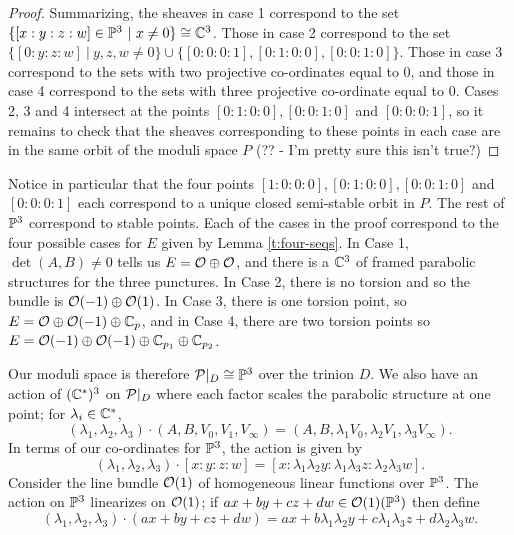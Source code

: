 \begin{proof}
		Summarizing, the sheaves in case 1 correspond to the set $\{[x:y:z:w]\in \mathbb{P}^3~|~ x\neq 0\} \cong \mathbb{C}^3$. Those in case 2 correspond to the set $\{[0:y:z:w]~|~ y,z,w\neq 0\}\cup \{[0:0:0:1],[0:1:0:0],[0:0:1:0]\}$. Those in case 3 correspond to the sets with two projective co-ordinates equal to 0, and those in case 4 correspond to the sets with three projective co-ordinate equal to 0. Cases 2, 3 and 4 intersect at the points $[0:1:0:0], [0:0:1:0]$ and $[0:0:0:1]$, so it remains to check that the sheaves corresponding to these points in each case are in the same orbit of the moduli space $P$ (?? - I'm pretty sure this isn't true?)
		
	\end{proof}
	Notice in particular that the four points $[1:0:0:0], [0:1:0:0], [0:0:1:0]$ and $[0:0:0:1]$ each correspond to a unique closed semi-stable orbit in $P$. The rest of $\mathbb{P}^3$ correspond to stable points. Each of the cases in the proof correspond to the four possible cases for $E$ given by Lemma \ref{t:four-seqs}. In Case 1, $\det(A,B)\neq 0$ tells us $E = \mathcal{O}\oplus \mathcal{O}$, and there is a $\mathbb{C}^3$ of framed parabolic structures for the three punctures. In Case 2, there is no torsion and so the bundle is $\mathcal{O}(-1)\oplus \mathcal{O}(1)$. In Case 3, there is one torsion point, so $E = \mathcal{O}\oplus \mathcal{O}(-1)\oplus \mathbb{C}_p$, and in Case 4, there are two torsion points so $E = \mathcal{O}(-1)\oplus \mathcal{O}(-1)\oplus \mathbb{C}_{p_1}\oplus \mathbb{C}_{p_2}$. 
	
	Our moduli space is therefore $\mathcal{P}|_D \cong \mathbb{P}^3$ over the trinion $D$. We also have an action of $(\mathbb{C}^\ast)^3$ on $\mathcal{P}|_D$ where each factor scales the parabolic structure at one point; for $\lambda_i\in \mathbb{C}^\ast$,
	\begin{equation}
		(\lambda_1,\lambda_2,\lambda_3)\cdot (A,B,V_0,V_1,V_\infty) = (A,B,\lambda_1 V_0, \lambda_2 V_1, \lambda_3 V_\infty).
	\end{equation}
	In terms of our co-ordinates for $\mathbb{P}^3$, the action is given by
	\begin{equation}
		(\lambda_1, \lambda_2,\lambda_3)\cdot [x:y:z:w] = [x:\lambda_1\lambda_2 y: \lambda_1\lambda_3 z: \lambda_2\lambda_3 w].
	\end{equation}
	Consider the line bundle $\mathcal{O}(1)$ of homogeneous linear functions over $\mathbb{P}^3$. The action on $\mathbb{P}^3$ linearizes on $\mathcal{O}(1)$; if $ax+by+cz+dw \in \mathcal{O}(1)(\mathbb{P}^3)$ then define
	\begin{equation}
	(\lambda_1, \lambda_2,\lambda_3) \cdot (ax+by+cz+dw) = ax +b\lambda_1\lambda_2 y + c\lambda_1\lambda_3 z + d\lambda_2\lambda_3 w. 
	\end{equation}
	
